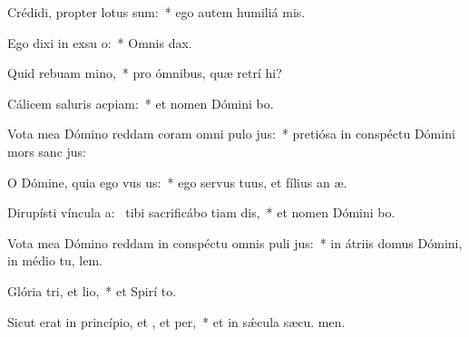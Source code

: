 \item Crédidi, propter  lotus sum:~* ego autem humiliá  mis.
\item Ego dixi in exsu o:~* Omnis  dax.
\item Quid rebuam mino,~* pro ómnibus, quæ retrí hi?
\item Cálicem saluris acpiam:~* et nomen Dómini bo.
\item Vota mea Dómino reddam coram omni pulo jus:~* pretiósa in conspéctu Dómini mors sanc jus:
\item O Dómine, quia ego vus us:~* ego servus tuus, et fílius an æ.
\item Dirupísti víncula a:~\pscross{} tibi sacrificábo tiam dis,~* et nomen Dómini bo.
\item Vota mea Dómino reddam in conspéctu omnis puli jus:~* in átriis domus Dómini, in médio tu, lem.
\item Glória tri, et lio,~* et Spirí to.
\item Sicut erat in princípio, et , et per,~* et in sǽcula sæcu. men.
